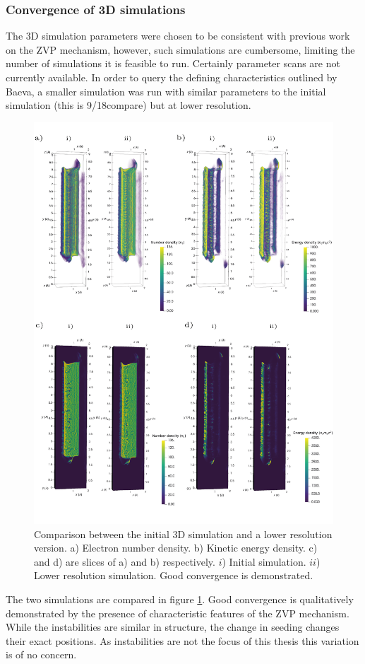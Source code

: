 \subsubsection{Convergence of 3D simulations}
The 3D simulation parameters were chosen to be consistent with previous work on the \ac{ZVP} mechanism, however, such simulations are cumbersome, limiting the number of simulations it is feasible to run. Certainly parameter scans are not currently available. In order to query the defining characteristics outlined by Baeva, a smaller simulation was run with similar parameters to the initial simulation (this is 9/18compare) but at lower resolution. 
\begin{figure}
	\centering
	\includegraphics[width=1\linewidth]{figures/zvp/zvp_3D_compare_lowres}
	\caption{Comparison between the initial 3D simulation and a lower resolution version. a) Electron number density. b) Kinetic energy density. c) and d) are slices of a) and b) respectively. $i$) Initial simulation. $ii$) Lower resolution simulation. Good convergence is demonstrated.}
	\label{fig:zvp3dcomparelowres}
\end{figure}
The two simulations are compared in figure \ref{fig:zvp3dcomparelowres}. Good convergence is qualitatively demonstrated by the presence of characteristic features of the ZVP mechanism. While the instabilities are similar in structure, the change in seeding changes their exact positions. As instabilities are not the focus of this thesis this variation is of no concern.


